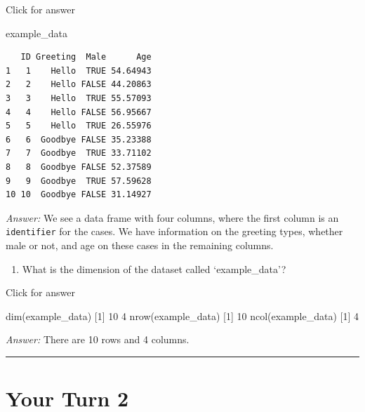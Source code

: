 \documentclass[
]{book}
\newenvironment{Shaded}{\begin{snugshade}}{\end{snugshade}}
\newcommand{\DecValTok}[1]{\textcolor[rgb]{0.00,0.00,0.81}{#1}}
\newcommand{\FunctionTok}[1]{\textcolor[rgb]{0.00,0.00,0.00}{#1}}
\newcommand{\NormalTok}[1]{#1}
\providecommand{\tightlist}{%
  \setlength{\itemsep}{0pt}\setlength{\parskip}{0pt}}
\begin{document}
Click for answer

\begin{Shaded}
\begin{Highlighting}[]
\NormalTok{example\_data}
\end{Highlighting}
\end{Shaded}

\begin{verbatim}
   ID Greeting  Male      Age
1   1    Hello  TRUE 54.64943
2   2    Hello FALSE 44.20863
3   3    Hello  TRUE 55.57093
4   4    Hello FALSE 56.95667
5   5    Hello  TRUE 26.55976
6   6  Goodbye FALSE 35.23388
7   7  Goodbye  TRUE 33.71102
8   8  Goodbye FALSE 52.37589
9   9  Goodbye  TRUE 57.59628
10 10  Goodbye FALSE 31.14927
\end{verbatim}

\emph{Answer:} We see a data frame with four columns, where the first column is an \texttt{identifier} for the cases. We have information on the greeting types, whether male or not, and age on these cases in the remaining columns.

\begin{enumerate}
\def\labelenumi{\alph{enumi}.}
\setcounter{enumi}{1}
\tightlist
\item
  What is the dimension of the dataset called `example\_data'?
\end{enumerate}

Click for answer

\begin{Shaded}
\begin{Highlighting}[]
\FunctionTok{dim}\NormalTok{(example\_data)}
\NormalTok{[}\DecValTok{1}\NormalTok{] }\DecValTok{10}  \DecValTok{4}
\FunctionTok{nrow}\NormalTok{(example\_data)}
\NormalTok{[}\DecValTok{1}\NormalTok{] }\DecValTok{10}
\FunctionTok{ncol}\NormalTok{(example\_data)}
\NormalTok{[}\DecValTok{1}\NormalTok{] }\DecValTok{4}
\end{Highlighting}
\end{Shaded}

\emph{Answer:} There are 10 rows and 4 columns.

\begin{center}\rule{0.5\linewidth}{0.5pt}\end{center}

\hypertarget{your-turn-2}{%
\section{Your Turn 2}\label{your-turn-2}}
\end{document}
